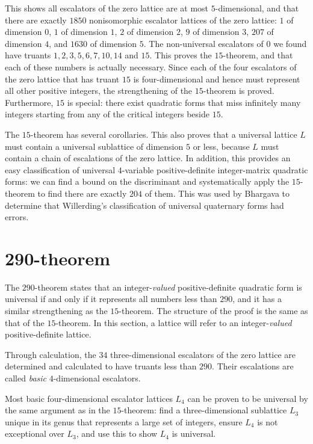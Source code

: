 \documentclass{article}
\begin{document}
This shows all escalators of the zero lattice are at most $5$-dimensional, and that there are exactly $1850$ nonisomorphic escalator lattices of the zero lattice: $1$ of dimension $0$, $1$ of dimension $1$, $2$ of dimension $2$, $9$ of dimension $3$, $207$ of dimension $4$, and $1630$ of dimension $5$. The non-universal escalators of $0$ we found have truants $1, 2, 3, 5, 6, 7, 10, 14$ and $15$. This proves the $15$-theorem, and that each of these numbers is actually necessary. Since each of the four escalators of the zero lattice that has truant $15$ is four-dimensional and hence must represent all other positive integers, the strengthening of the $15$-theorem is proved. Furthermore, $15$ is special: there exist quadratic forms that miss infinitely many integers starting from any of the critical integers beside $15$.

The $15$-theorem has several corollaries. This also proves that a universal lattice $L$ must contain a universal sublattice of dimension $5$ or less, because $L$ must contain a chain of escalations of the zero lattice. In addition, this provides an easy classification of universal $4$-variable positive-definite integer-matrix quadratic forms: we can find a bound on the discriminant and systematically apply the $15$-theorem to find there are exactly $204$ of them. This was used by Bhargava to determine that Willerding's classification of universal quaternary forms had errors.

\section{290-theorem}
The $290$-theorem states that an integer-\emph{valued} positive-definite quadratic form is universal if and only if it represents all numbers less than $290$, and it has a similar strengthening as the $15$-theorem.
The structure of the proof is the same as that of the $15$-theorem.
In this section, a lattice will refer to an integer-\emph{valued} positive-definite lattice.

Through calculation, the $34$ three-dimensional escalators of the zero lattice are determined and calculated to have truants less than $290$.
Their escalations are called \emph{basic} $4$-dimensional escalators.

Most basic four-dimensional escalator lattices $L_4$ can be proven to be universal by the same argument as in the $15$-theorem:
find a three-dimensional sublattice $L_3$ unique in its genus that represents a large set of integers, ensure $L_4$ is not exceptional over $L_3$, and use this to show $L_4$ is universal.
\end{document}
